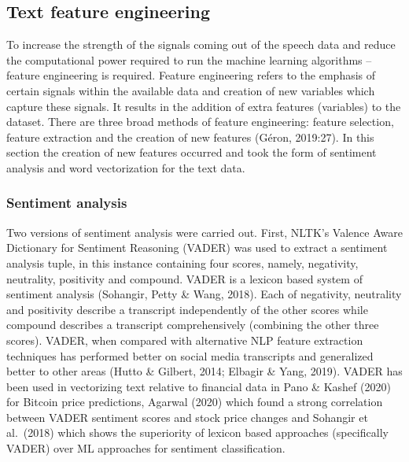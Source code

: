 \documentclass[11pt,preprint, authoryear]{elsarticle}
\numberwithin{equation}{section}
\numberwithin{figure}{section}
\numberwithin{table}{section}
\begin{document}
\hypertarget{text-feature-engineering}{%
\subsection{Text feature engineering}\label{text-feature-engineering}}

To increase the strength of the signals coming out of the speech data
and reduce the computational power required to run the machine learning
algorithms -- feature engineering is required. Feature engineering
refers to the emphasis of certain signals within the available data and
creation of new variables which capture these signals. It results in the
addition of extra features (variables) to the dataset. There are three
broad methods of feature engineering: feature selection, feature
extraction and the creation of new features (Géron, 2019:27). In this
section the creation of new features occurred and took the form of
sentiment analysis and word vectorization for the text data.

\hypertarget{sentiment-analysis}{%
\subsubsection{Sentiment analysis}\label{sentiment-analysis}}

Two versions of sentiment analysis were carried out. First, NLTK's
Valence Aware Dictionary for Sentiment Reasoning (VADER) was used to
extract a sentiment analysis tuple, in this instance containing four
scores, namely, negativity, neutrality, positivity and compound. VADER
is a lexicon based system of sentiment analysis (Sohangir, Petty \&
Wang, 2018). Each of negativity, neutrality and positivity describe a
transcript independently of the other scores while compound describes a
transcript comprehensively (combining the other three scores). VADER,
when compared with alternative NLP feature extraction techniques has
performed better on social media transcripts and generalized better to
other areas (Hutto \& Gilbert, 2014; Elbagir \& Yang, 2019). VADER has
been used in vectorizing text relative to financial data in Pano \&
Kashef (2020) for Bitcoin price predictions, Agarwal (2020) which found
a strong correlation between VADER sentiment scores and stock price
changes and Sohangir et al.~(2018) which shows the superiority of
lexicon based approaches (specifically VADER) over ML approaches for
sentiment classification.
\end{document}

